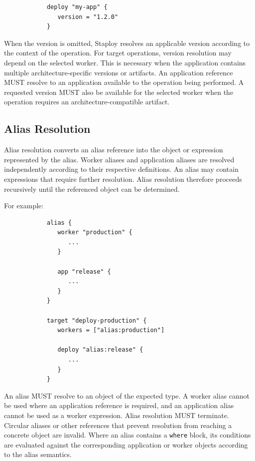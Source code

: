 \documentclass[11pt,a4paper]{article}
\begin{document}
    \begin{center}
        \begin{verbatim}
            deploy "my-app" {
               version = "1.2.0"
            }
        \end{verbatim}
    \end{center}

    When the version is omitted, Staploy resolves an applicable version according to the context of the operation.
    For target operations, version resolution may depend on the selected worker.
    This is necessary when the application contains multiple architecture-specific versions or artifacts.
    An application reference MUST resolve to an application available to the operation being performed.
    A requested version MUST also be available for the selected worker when the operation requires an architecture-compatible artifact.

    \subsection{Alias Resolution}\label{subsec:alias-resolution2}

    Alias resolution converts an alias reference into the object or expression represented by the alias.
    Worker aliases and application aliases are resolved independently according to their respective definitions.
    An alias may contain expressions that require further resolution.
    Alias resolution therefore proceeds recursively until the referenced object can be determined.

    For example:

    \begin{center}
        \begin{verbatim}
            alias {
               worker "production" {
                  ...
               }

               app "release" {
                  ...
               }
            }

            target "deploy-production" {
               workers = ["alias:production"]

               deploy "alias:release" {
                  ...
               }
            }
        \end{verbatim}
    \end{center}

    An alias MUST resolve to an object of the expected type.
    A worker alias cannot be used where an application reference is required, and an application alias cannot be used as a worker expression.
    Alias resolution MUST terminate.
    Circular aliases or other references that prevent resolution from reaching a concrete object are invalid.
    Where an alias contains a \texttt{where} block, its conditions are evaluated against the corresponding application or worker objects according to the alias semantics.
\end{document}
